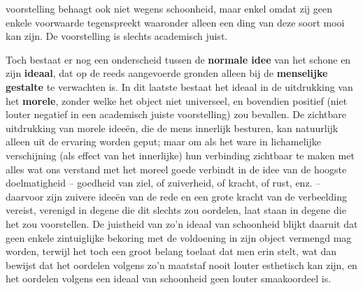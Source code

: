 voorstelling behaagt ook niet wegens schoonheid, maar enkel omdat zij geen enkele voorwaarde tegenspreekt waaronder alleen een ding van deze soort mooi kan zijn. De voorstelling is slechts academisch juist.

Toch bestaat er nog een onderscheid tussen de \textbf{normale idee} van het schone en zijn \textbf{ideaal}, dat op de reeds aangevoerde gronden alleen bij de \textbf{menselijke gestalte} te verwachten is. In dit laatste bestaat het ideaal in de uitdrukking van het \textbf{morele}, zonder welke het object niet universeel, en bovendien positief (niet louter negatief in een academisch juiste voorstelling) zou bevallen. De zichtbare uitdrukking van morele ideeën, die de mens innerlijk besturen, kan natuurlijk alleen uit de ervaring worden geput; maar om als het ware in lichamelijke verschijning (als effect van het innerlijke) hun verbinding zichtbaar te maken met alles wat ons verstand met het moreel goede verbindt in de idee van de hoogste doelmatigheid – goedheid van ziel, of zuiverheid, of kracht, of rust, enz. – daarvoor zijn zuivere ideeën van de rede en een grote kracht van de verbeelding vereist, verenigd in degene die dit slechts zou oordelen, laat staan in degene die het zou voorstellen. De juistheid van zo’n ideaal van schoonheid blijkt daaruit dat geen enkele zintuiglijke bekoring met de voldoening in zijn object vermengd mag worden, terwijl het toch een groot belang toelaat dat men erin stelt, wat dan bewijst dat het oordelen volgens zo’n maatstaf nooit louter esthetisch kan zijn, en het oordelen volgens een ideaal van schoonheid geen louter smaak­oordeel is.

